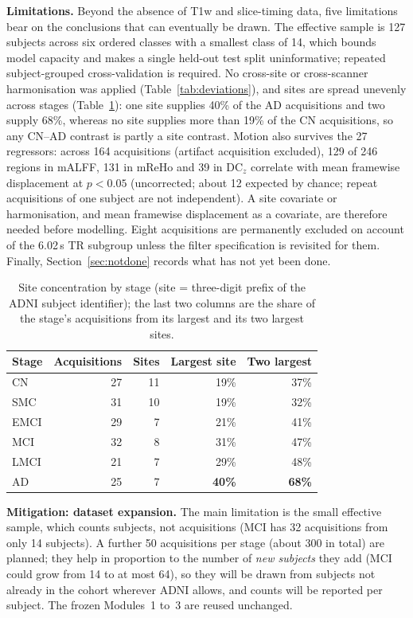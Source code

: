 \documentclass{ssnreview}
\begin{document}
\textbf{Limitations.} Beyond the absence of T1w and slice-timing data, five
limitations bear on the conclusions that can eventually be drawn. The effective
sample is 127 subjects across six ordered classes with a smallest class of 14, which bounds
model capacity and makes a single held-out test split uninformative; repeated
subject-grouped cross-validation is required. No cross-site or cross-scanner
harmonisation was applied (Table~\ref{tab:deviations}), and sites are spread unevenly across stages
(Table~\ref{tab:site}): one site supplies 40\% of the AD acquisitions and two supply 68\%, whereas no
site supplies more than 19\% of the CN acquisitions, so any CN--AD contrast is partly a site contrast.
Motion also survives the 27 regressors: across 164 acquisitions (artifact acquisition excluded), 129
of 246 regions in mALFF, 131 in mReHo and 39 in DC$_z$ correlate with mean framewise displacement
at $p<0.05$ (uncorrected; about 12 expected by chance; repeat acquisitions of one subject are not
independent). A site covariate or harmonisation, and mean framewise displacement as a covariate,
are therefore needed before modelling. Eight acquisitions are
permanently excluded on account of the 6.02\,s TR subgroup unless the filter
specification is revisited for them. Finally, Section~\ref{sec:notdone} records what has not yet been done.

\begin{table}[!htbp]
\centering
\caption[Site concentration by stage]{Site concentration by stage (site = three-digit prefix of the ADNI subject
identifier); the last two columns are the share of the stage's acquisitions from its largest and its
two largest sites.}
\label{tab:site}
\small
\begin{tabular}{@{}lrrrr@{}}
\toprule
\textbf{Stage} & \textbf{Acquisitions} & \textbf{Sites} & \textbf{Largest site} & \textbf{Two largest} \\
\midrule
CN & 27 & 11 & 19\% & 37\% \\
SMC & 31 & 10 & 19\% & 32\% \\
EMCI & 29 & 7 & 21\% & 41\% \\
MCI & 32 & 8 & 31\% & 47\% \\
LMCI & 21 & 7 & 29\% & 48\% \\
AD & 25 & 7 & \textbf{40\%} & \textbf{68\%} \\
\bottomrule
\end{tabular}
\end{table}

\textbf{Mitigation: dataset expansion.} The main limitation is the small effective sample, which
counts subjects, not acquisitions (MCI has 32 acquisitions from only 14 subjects). A further 50
acquisitions per stage (about 300 in total) are planned; they help in proportion to the number of
\emph{new subjects} they add (MCI could grow from 14 to at most 64), so they will be drawn from
subjects not already in the cohort wherever ADNI allows, and counts will be reported per subject.
The frozen Modules~1 to~3 are reused unchanged.
\end{document}
